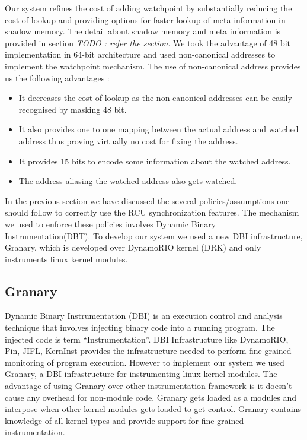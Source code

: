 Our system refines the cost of adding watchpoint by substantially reducing the cost of lookup and providing options for faster lookup of meta information in shadow memory. The detail about shadow memory and meta information is provided in section \emph{TODO : refer the section}. We took the advantage of 48 bit implementation in 64-bit architecture and used non-canonical addresses to implement the watchpoint mechanism. The use of non-canonical address provides us the following advantages :
\begin{itemize}
	\item It decreases the cost of lookup as the non-canonical addresses can be easily recognised by masking 48 bit.
	\item It also provides one to one mapping between the actual address and watched address thus proving virtually no cost for fixing the address.
	\item It provides 15 bits to encode some information about the watched address.
	\item The address aliasing the watched address also gets watched.
\end{itemize}   





In the previous section we have discussed the several policies/assumptions one should follow to correctly use the RCU synchronization features. The mechanism we used to enforce these policies involves Dynamic Binary Instrumentation(DBT). To develop our system we used a new DBI infrastructure, Granary, which is developed over DynamoRIO kernel (DRK) and only instruments linux kernel modules. 

\subsection{Granary}
Dynamic Binary Instrumentation (DBI) is an execution control and analysis technique that involves injecting binary code into a running program. The injected code is term “Instrumentation”. DBI Infrastructure like DynamoRIO, Pin, JIFL, KernInst provides the infrastructure needed to perform fine-grained monitoring of program execution. However to implement our system we used Granary, a DBI infrastructure for instrumenting linux kernel modules. The advantage of using Granary over other instrumentation framework is it doesn’t cause any overhead for non-module code. Granary gets loaded as a modules and interpose when other kernel modules gets loaded to get control. Granary contains knowledge of all kernel types and provide support for fine-grained instrumentation.

